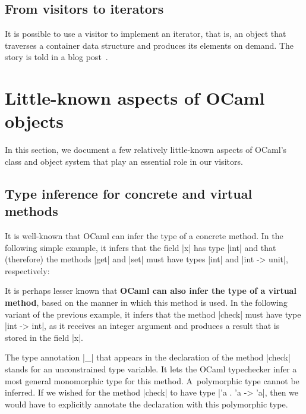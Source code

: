 \documentclass[11pt,a4paper,twoside]{article}
\renewcommand{\emph}[1]{\textbf{#1}}
\begin{document}

\subsection{From visitors to iterators}
\label{sec:iterators}

It is possible to use a visitor to implement an iterator, that is, an object
that traverses a container data structure and produces its elements on demand.
The story is told in a blog post~\cite{iterators}.


\section{Little-known aspects of OCaml objects}
\label{sec:oo}

In this section, we document a few relatively little-known aspects of OCaml's
class and object system that play an essential role in our visitors.


\subsection{Type inference for concrete and virtual methods}
\label{sec:oo:infer}

It is well-known that OCaml can infer the type of a concrete method. In the
following simple example, it infers that the field \oc|x| has type \oc|int|
and that (therefore) the methods \oc|get| and \oc|set| must have types
\oc|int| and \oc|int -> unit|, respectively:
%

It is perhaps lesser known that \emph{OCaml can also infer the type of a
  virtual method}, based on the manner in which this method is used. In the
following variant of the previous example, it infers that the method
\oc|check| must have type \oc|int -> int|, as it receives an integer argument
and produces a result that is stored in the field \oc|x|.
%

The type annotation \oc|_| that appears in the declaration of the method
\oc|check| stands for an unconstrained type variable. It lets the OCaml
typechecker infer a most general monomorphic type for this method.
A~polymorphic type cannot be inferred. If we wished for the method \oc|check|
to have type \oc|'a . 'a -> 'a|, then we would have to explicitly annotate the
declaration with this polymorphic type.
\end{document}
